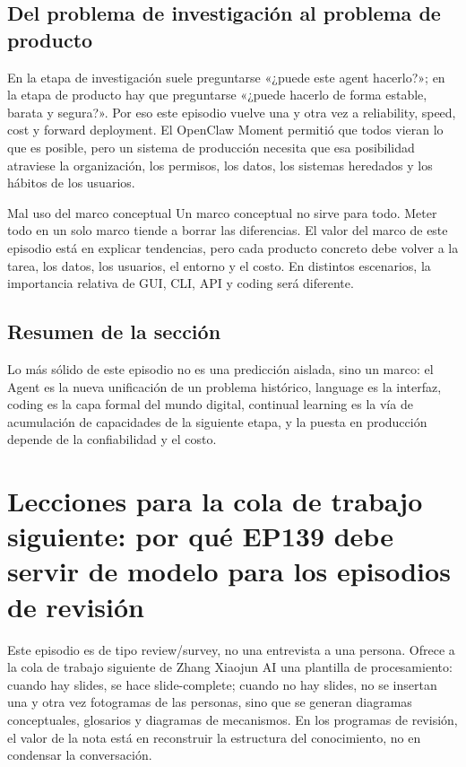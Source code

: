 \documentclass[a4paper]{article}
\begin{document}
\subsection{Del problema de investigación al problema de producto}

En la etapa de investigación suele preguntarse «¿puede este agent hacerlo?»; en la etapa de producto hay que preguntarse «¿puede hacerlo de forma estable, barata y segura?». Por eso este episodio vuelve una y otra vez a reliability, speed, cost y forward deployment. El OpenClaw Moment permitió que todos vieran lo que es posible, pero un sistema de producción necesita que esa posibilidad atraviese la organización, los permisos, los datos, los sistemas heredados y los hábitos de los usuarios.

\begin{warningbox}{Mal uso del marco conceptual}
Un marco conceptual no sirve para todo. Meter todo en un solo marco tiende a borrar las diferencias. El valor del marco de este episodio está en explicar tendencias, pero cada producto concreto debe volver a la tarea, los datos, los usuarios, el entorno y el costo. En distintos escenarios, la importancia relativa de GUI, CLI, API y coding será diferente.
\end{warningbox}

\subsection{Resumen de la sección}

Lo más sólido de este episodio no es una predicción aislada, sino un marco: el Agent es la nueva unificación de un problema histórico, language es la interfaz, coding es la capa formal del mundo digital, continual learning es la vía de acumulación de capacidades de la siguiente etapa, y la puesta en producción depende de la confiabilidad y el costo.
\section{Lecciones para la cola de trabajo siguiente: por qué EP139 debe servir de modelo para los episodios de revisión}

Este episodio es de tipo review/survey, no una entrevista a una persona. Ofrece a la cola de trabajo siguiente de Zhang Xiaojun AI una plantilla de procesamiento: cuando hay slides, se hace slide-complete; cuando no hay slides, no se insertan una y otra vez fotogramas de las personas, sino que se generan diagramas conceptuales, glosarios y diagramas de mecanismos. En los programas de revisión, el valor de la nota está en reconstruir la estructura del conocimiento, no en condensar la conversación.
\end{document}
